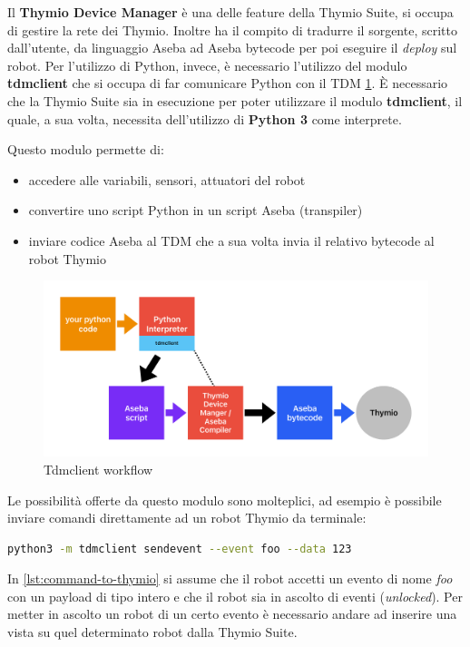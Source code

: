 \documentclass[12pt,a4paper,openright,twoside]{book}
\begin{document}
Il \textbf{Thymio Device Manager} è una delle feature della Thymio Suite, si occupa di gestire la rete dei Thymio. Inoltre ha il compito di tradurre il sorgente, scritto dall'utente, da linguaggio Aseba ad Aseba bytecode per poi eseguire il \textit{deploy} sul robot. Per l'utilizzo di Python, invece, è necessario l'utilizzo del modulo \textbf{tdmclient} che si occupa di far comunicare Python con il \ac{TDM} \cref{fig:tdmclient}. È necessario che la Thymio Suite sia in esecuzione per poter utilizzare il modulo \textbf{tdmclient}, il quale, a sua volta, necessita dell'utilizzo di \textbf{Python 3} come interprete.

Questo modulo permette di:
\begin{itemize}
    \item accedere alle variabili, sensori, attuatori del robot
    \item convertire uno script Python in un script Aseba (transpiler)
    \item inviare codice Aseba al \ac{TDM} che a sua volta invia il relativo bytecode al  robot Thymio 
\end{itemize}

\begin{figure}
    \centering
    \includegraphics[width=.8\linewidth]{figures/TDM.pdf}
    \caption{Tdmclient workflow}
    \label{fig:tdmclient}
\end{figure}

Le possibilità offerte da questo modulo sono molteplici, ad esempio è possibile inviare comandi direttamente ad un robot Thymio da terminale:

\begin{lstlisting}[language=Bash, label={lst:command-to-thymio}, caption={Esempio di invio di comando (foo) ad un robot Thymio}]
    python3 -m tdmclient sendevent --event foo --data 123
\end{lstlisting}

In \cref{lst:command-to-thymio} si assume che il robot accetti un evento di nome \textit{foo} con un payload di tipo intero e che il robot sia in ascolto di eventi (\textit{unlocked}). Per metter in ascolto un robot di un certo evento è necessario andare ad inserire una vista su quel determinato robot dalla Thymio Suite.
\end{document}
